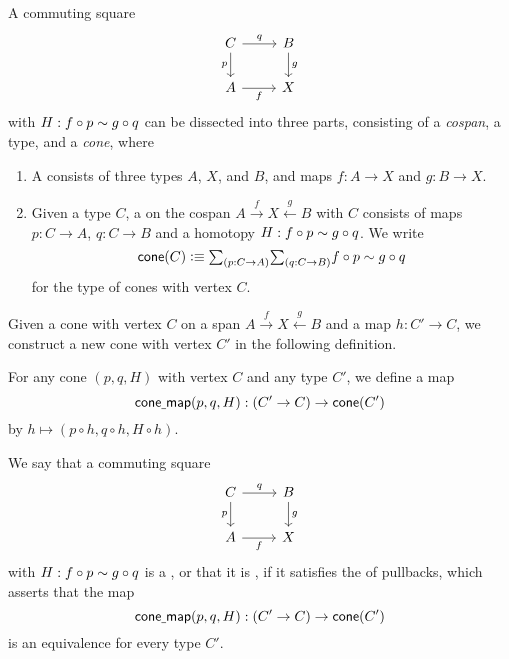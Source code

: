 \begin{defn}\label{defn:cospan}
A commuting square
\begin{equation*}
\begin{tikzcd}
C \arrow[r,"q"] \arrow[d,swap,"p"] & B \arrow[d,"g"] \\
A \arrow[r,swap,"f"] & X
\end{tikzcd}
\end{equation*}
with $H:f\circ p\sim g\circ q$ can be dissected into three parts, consisting of a \emph{cospan}, a type, and a \emph{cone}, where
\begin{enumerate}
\item A  consists of three types $A$, $X$, and $B$, and maps $f:A\to X$ and $g:B\to X$.
\item Given a type $C$, a  on the cospan $A \stackrel{f}{\rightarrow} X \stackrel{g}{\leftarrow} B$ with  $C$ consists of maps $p:C\to A$, $q:C\to B$ and a homotopy $H:f\circ p\sim g\circ q$. We write
\begin{equation*}
\cone(C)\defeq \sm{p:C\to A}{q:C\to B}f\circ p\htpy g\circ q
\end{equation*}
for the type of cones with vertex $C$.
\end{enumerate}
\end{defn}

Given a cone with vertex $C$ on a span $A\stackrel{f}{\rightarrow} X \stackrel{g}{\leftarrow} B$ and a map $h:C'\to C$, we construct a new cone with vertex $C'$ in the following definition.

\begin{defn}
For any cone $(p,q,H)$ with vertex $C$ and any type $C'$, we define a map
\begin{equation*}
\mathsf{cone\underline{\ }{}map}(p,q,H):(C'\to C)\to\mathsf{cone}(C')
\end{equation*}
by $h\mapsto (p\circ h,q\circ h,H\circ h)$. 
\end{defn}

\begin{defn}
We say that a commuting square
\begin{equation*}
\begin{tikzcd}
C \arrow[r,"q"] \arrow[d,swap,"p"] & B \arrow[d,"g"] \\
A \arrow[r,swap,"f"] & X
\end{tikzcd}
\end{equation*}
with $H:f\circ p\sim g\circ q$ is a , or that it is , if it satisfies the  of pullbacks, which asserts that the map
\begin{equation*}
\mathsf{cone\underline{\ }{}map}(p,q,H):(C'\to C)\to\mathsf{cone}(C')
\end{equation*}
is an equivalence for every type $C'$. 
\end{defn}

